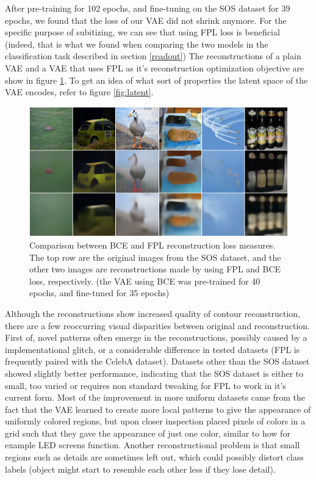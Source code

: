 \documentclass[twocolumn]{article}
\begin{document}
{After pre-training for 102 epochs, and fine-tuning on the SOS dataset
for 39 epochs, we found that the loss of our VAE did not shrink anymore.
For the specific purpose of subitizing, we can see that using FPL loss
is beneficial (indeed, that is what we found when comparing the two
models in the classification task described in
section \ref{readout}) The reconstructions of a plain
VAE and a VAE that uses FPL as it's reconstruction optimization
objective are show in figure \ref{fig:dfc_comp}. To get an idea of what sort of
properties the latent space of the VAE encodes, refer to figure \ref{fig:latent}.

\begin{figure}
\centering
\includegraphics{dfc_bce.png}
\caption{Comparison between BCE and FPL reconstruction loss measures. The top row are the original images from the SOS dataset, and the other two images are reconstructions made by using FPL and BCE loss, respectively. (the VAE using BCE was pre-trained for 40 epochs, and fine-tuned for 35 epochs)}
\label{fig:dfc_comp}
\end{figure}


Although the reconstructions show increased quality of contour
reconstruction, there are a few reoccurring visual disparities between
original and reconstruction. First of, novel patterns often emerge in
the reconstructions, possibly caused by a implementational glitch, or a
considerable difference in tested datasets (FPL is frequently paired
with the CelebA \citep{liu2015deep} dataset). Datasets other than the
SOS dataset showed slightly better performance, indicating that the SOS
dataset is either to small, too varied or requires non standard tweaking
for FPL to work in it's current form. Most of the improvement in more
uniform datasets came from the fact that the VAE learned to create more
local patterns to give the appearance of uniformly colored regions, but
upon closer inspection placed pixels of colors in a grid such that they
gave the appearance of just one color, similar to how for example LED
screens function. Another reconstructional problem is that small regions such as details are sometimes left out, which
could possibly distort class labels (object might start to resemble each
other less if they lose detail).

}
\end{document}
